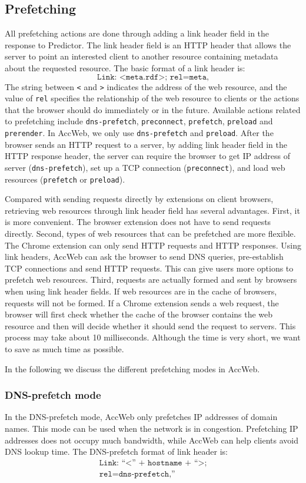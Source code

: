 \subsection{Prefetching}

All prefetching actions are done through adding a link header field in the response to Predictor. The link header field is an HTTP header that allows the server to point an interested client to another resource containing metadata about the requested resource. The basic format of a link header is: \[\texttt{Link: <meta.rdf>; rel=meta,}\]
The string between \texttt{<} and \texttt{>} indicates the address of the web resource, and the value of \texttt{rel} specifies the relationship of the web resource to clients or the actions that the browser should do immediately or in the future. Available actions related to prefetching include \texttt{dns-prefetch}, \texttt{preconnect}, \texttt{prefetch}, \texttt{preload} and \texttt{prerender}. In AccWeb, we only use \texttt{dns-prefetch} and \texttt{preload}. After the browser sends an HTTP request to a server, by adding link header field in the HTTP response header, the server can require the browser to get IP address of server (\texttt{dns-prefetch}), set up a TCP connection (\texttt{preconnect}), and load web resources (\texttt{prefetch} or \texttt{preload}).

Compared with sending requests directly by extensions on client browsers, retrieving web resources through link header field has several advantages. First, it is more convenient. The browser extension does not have to send requests directly. Second, types of web resources that can be prefetched are more flexible. The Chrome extension can only send HTTP requests and HTTP responses. Using link headers, AccWeb can ask the browser to send DNS queries, pre-establish TCP connections and send HTTP requests. This can give users more options to prefetch web resources. Third, requests are actually formed and sent by browsers when using link header fields. If web resources are in the cache of browsers, requests will not be formed. If a Chrome extension sends a web request, the browser will first check whether the cache of the browser contains the web resource and then will decide whether it should send the request to servers. This process may take about 10 milliseconds. Although the time is very short, we want to save as much time as possible.

In the following we discuss the different prefetching modes in AccWeb.

\subsubsection*{DNS-prefetch mode}
In the DNS-prefetch mode, AccWeb only prefetches IP addresses of domain names. This mode can be used when the network is in congestion. Prefetching IP addresses does not occupy much bandwidth, while AccWeb can help clients avoid DNS lookup time. The DNS-prefetch format of link header is: 
\begin{align*}
\texttt{Link: ``<'' + hostname + ``>;}\\
\texttt{rel=dns-prefetch,''}
\end{align*}

